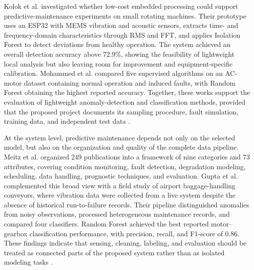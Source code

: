 \documentclass[english,hidelinks]{sbrt}
\begin{document}
Kolok et al. investigated whether low-cost embedded processing could support predictive-maintenance experiments on small rotating machines. Their prototype uses an ESP32 with MEMS vibration and acoustic sensors, extracts time- and frequency-domain characteristics through RMS and FFT, and applies Isolation Forest to detect deviations from healthy operation. The system achieved an overall detection accuracy above 72.9\%, showing the feasibility of lightweight local analysis but also leaving room for improvement and equipment-specific calibration. Mohammed et al. compared five supervised algorithms on an AC-motor dataset containing normal operation and induced faults, with Random Forest obtaining the highest reported accuracy. Together, these works support the evaluation of lightweight anomaly-detection and classification methods, provided that the proposed project documents its sampling procedure, fault simulation, training data, and independent test data \cite{kolok2025lowcost,mohammed2023iot}.

At the system level, predictive maintenance depends not only on the selected model, but also on the organization and quality of the complete data pipeline. Meitz et al. organized 249 publications into a framework of nine categories and 73 attributes, covering condition monitoring, fault detection, degradation modeling, scheduling, data handling, prognostic techniques, and evaluation. Gupta et al. complemented this broad view with a field study of airport baggage-handling conveyors, where vibration data were collected from a live system despite the absence of historical run-to-failure records. Their pipeline distinguished anomalies from noisy observations, processed heterogeneous maintenance records, and compared four classifiers. Random Forest achieved the best reported motor--gearbox classification performance, with precision, recall, and F1-score of 0.86. These findings indicate that sensing, cleaning, labeling, and evaluation should be treated as connected parts of the proposed system rather than as isolated modeling tasks \cite{meitz2025pdmframework,gupta2023baggage}.
\end{document}
